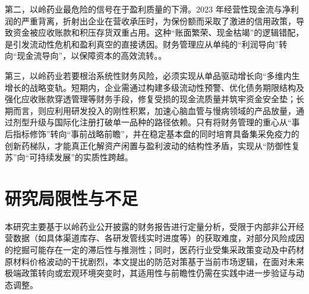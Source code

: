 \documentclass[12pt,a4paper,fontset=windows,UTF8]{ctexart}
\begin{document}
第二，以岭药业最危险的信号在于盈利质量的下滑。2023 年经营性现金流与净利润的严重背离，折射出企业在营收承压时，为保份额而采取了激进的信用政策，导致资金被应收账款和积压存货双重占用。这种“账面繁荣、现金枯竭”的逻辑错配，是引发流动性危机和盈利真空的直接诱因。财务管理应从单纯的“利润导向”转向“现金流导向”，以保障资本的高效流转。。

第三，以岭药业若要根治系统性财务风险，必须实现从单品驱动增长向“多维内生增长的战略变轨。短期内，企业需通过构建多级流动性预警、优化债务期限结构及强化应收账款穿透管理等财务手段，修复受损的现金流质量并筑牢资金安全垫；长期而言，则应利用研发投入的刚性积累，加速心脑血管与慢病领域的产品放量，通过剂型升级与国际化注册打破单一品种的路径依赖。只有将财务管理的重心从“事后指标修饰”转向“事前战略前瞻”，并在稳定基本盘的同时培育具备集采免疫力的创新药梯队，才能真正化解资产闲置与盈利波动的结构性矛盾，实现从“防御性复苏”向“可持续发展”的实质性跨越。

\section{研究局限性与不足}
本研究主要基于以岭药业公开披露的财务报告进行定量分析，受限于内部非公开经营数据（如具体渠道库存、各研发管线实时进度等）的获取难度，对部分风险成因的挖掘可能存在一定的滞后性与推测性；同时，医药行业受集采政策变动及中药材原材料价格波动的干扰剧烈，本文提出的防范对策基于当前市场逻辑，在面对未来极端政策转向或宏观环境突变时，其适用性与前瞻性仍需在实践中进一步验证与动态调整。


\newpage
\vspace*{3\baselineskip}
\end{document}
